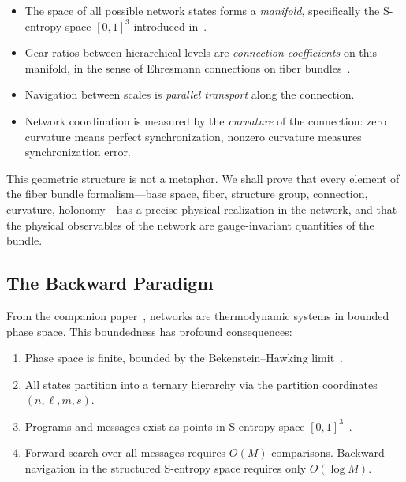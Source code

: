\documentclass[11pt,twocolumn,a4paper]{article}
\theoremstyle{definition}
\begin{document}
\begin{itemize}
  \item The space of all possible network states forms a \emph{manifold}, specifically the
        S-entropy space $[0,1]^3$ introduced in~\cite{sachikonye2025c}.
  \item Gear ratios between hierarchical levels are \emph{connection coefficients} on this
        manifold, in the sense of Ehresmann connections on fiber
        bundles~\cite{kobayashi1963,nakahara2003}.
  \item Navigation between scales is \emph{parallel transport} along the connection.
  \item Network coordination is measured by the \emph{curvature} of the connection:
        zero curvature means perfect synchronization, nonzero curvature measures
        synchronization error.
\end{itemize}

This geometric structure is not a metaphor. We shall prove that every element of the
fiber bundle formalism---base space, fiber, structure group, connection, curvature,
holonomy---has a precise physical realization in the network, and that the physical
observables of the network are gauge-invariant quantities of the bundle.

\subsection{The Backward Paradigm}\label{sec:intro:backward}

From the companion paper~\cite{sachikonye2025e}, networks are thermodynamic systems
in bounded phase space. This boundedness has profound consequences:

\begin{enumerate}[label=(\roman*)]
  \item Phase space is finite, bounded by the Bekenstein--Hawking
        limit~\cite{bekenstein1973}.
  \item All states partition into a ternary hierarchy via the partition coordinates
        $(n, \ell, m, s)$.
  \item Programs and messages exist as points in S-entropy space
        $[0,1]^3$~\cite{sachikonye2025c,sachikonye2025d}.
  \item Forward search over all messages requires $O(M)$ comparisons. Backward navigation
        in the structured S-entropy space requires only $O(\log M)$.
\end{enumerate}
\end{document}
